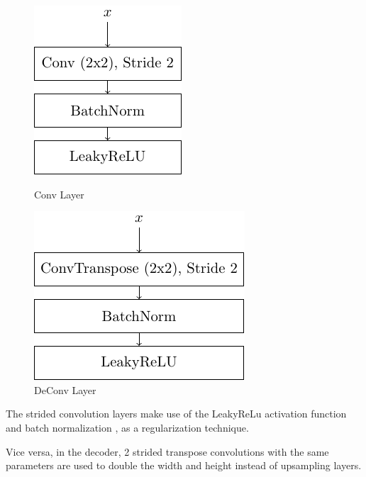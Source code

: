 \begin{figure}[h!]
    \centering
    \begin{minipage}[b]{0.45\textwidth}
        \centering
        \includegraphics[]{figures/model_architecture/build/conv_layer.pdf}
        \caption{Conv Layer}
    \end{minipage}
    \hfill
    \begin{minipage}[b]{0.45\textwidth}
        \centering
        \includegraphics[]{figures/model_architecture/build/deconv_layer.pdf}
        \caption{DeConv Layer}
    \end{minipage}
\end{figure}

The strided convolution layers make use of the LeakyReLu activation function and batch normalization \parencite{BatchNorm}, as a regularization technique.

Vice versa, in the decoder, 2 strided transpose convolutions with the same parameters are used to double the width and height instead of upsampling layers.

